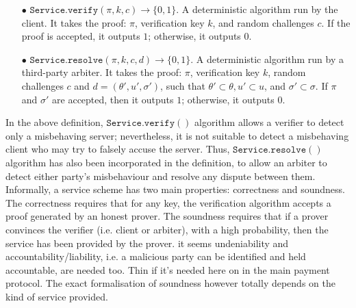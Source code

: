 \begin{definition}
\begin{itemize}
\item[$\bullet$] $\mathtt{Service.verify}(\pi,k,c)\rightarrow \{0,1\}$. A deterministic algorithm run by the client. It takes the proof: $\pi$, verification key $k$, and random challenges $c$. If the proof is accepted, it outputs $1$; otherwise, it outputs $0$. 

\item[$\bullet$]  $\mathtt{Service.resolve}(\pi,k,c,d)\rightarrow \{0,1\}$. A deterministic algorithm run by a third-party arbiter. It takes the proof: $\pi$, verification key $k$,  random challenges $c$ and $d=(\theta',u',\sigma')$, such that $\theta'\subset\theta, u'\subset u$, and $\sigma'\subset \sigma$.  If  $\pi$ and  $\sigma'$ are accepted, then it outputs $1$; otherwise, it outputs $0$. 

\end{itemize}
\end{definition}

In the above definition,  $\mathtt{Service.verify}()$ algorithm  allows a verifier to detect only a misbehaving server; nevertheless, it is not suitable to  detect a misbehaving client who may try to falsely accuse the server.  Thus, $\mathtt{Service.resolve()}$ algorithm has also been incorporated in the definition, to allow an arbiter to detect either party's misbehaviour and resolve any dispute between them.  Informally, a service scheme has two main properties: correctness and soundness. The correctness requires that for any key, the verification algorithm accepts a proof generated by an honest prover. The soundness requires that if a prover convinces the verifier (i.e. client or arbiter), with a high probability, then the service has been provided by the prover. {\color {blue} it seems undeniability and accountability/liability, i.e. a malicious party can be identified and held accountable, are needed too. Thin if it's needed here on in the main payment protocol.}
The exact formalisation of soundness however totally depends on the kind of service provided. 





